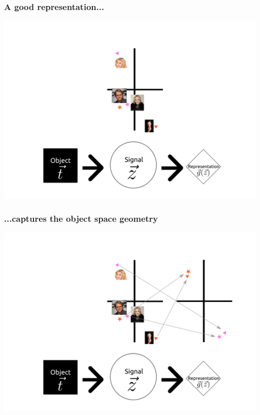 \documentclass{beamer}
\begin{document}
\begin{frame}
\frametitle{A good representation...}
\begin{center}
\includegraphics[scale = 0.4]{defense_diagrams/geometry2.png}
\end{center}
\end{frame}

\begin{frame}
\frametitle{...captures the object space geometry}
\begin{center}
\includegraphics[scale = 0.4]{defense_diagrams/geometry2a.png}
\end{center}
\end{frame}
\end{document}
